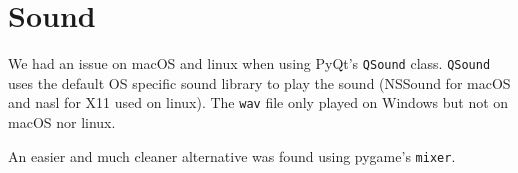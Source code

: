 \section{Sound}\label{sec:sound}

We had an issue on macOS and linux when using PyQt's \texttt{QSound} class.
\texttt{QSound} uses the default OS specific sound library to play the sound
(NSSound for macOS and \gls{nasl} for X11 used on linux). The \texttt{wav} file
only played on Windows but not on macOS nor linux.

An easier and much cleaner alternative was found using pygame's \texttt{mixer}.

